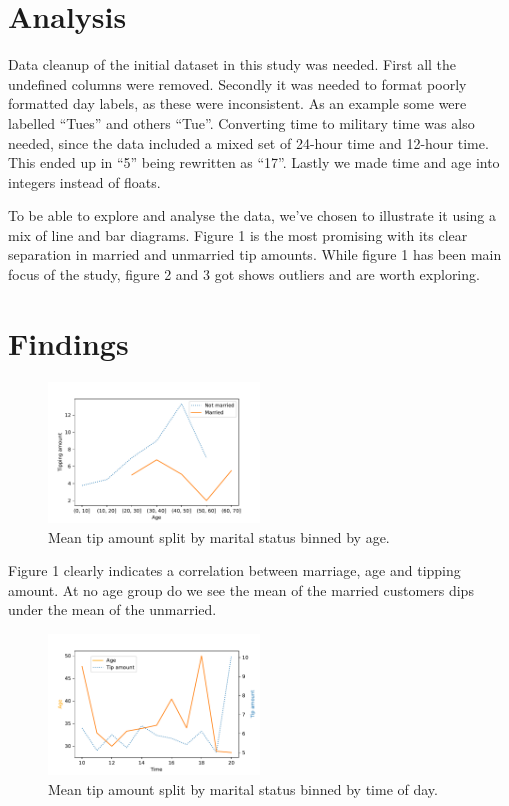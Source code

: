 \documentclass[twoside,twocolumn]{article}
\begin{document}
\section{Analysis}Data cleanup of the initial dataset in this study was needed. First all the undefined columns were removed. Secondly it was needed to format poorly formatted day labels, as these were inconsistent. As an example some were labelled “Tues” and others “Tue”. Converting time to military time was also needed, since the data included a mixed set of 24-hour time and 12-hour time. This ended up in “5” being rewritten as “17”. Lastly we made time and age into integers instead of floats.

To be able to explore and analyse the data, we've chosen to illustrate it using a mix of line and bar diagrams. Figure 1 is the most promising with its clear separation in married and unmarried tip amounts. While figure 1 has been main focus of the study, figure 2 and 3 got shows outliers and are worth exploring.



\section{Findings}

\begin{figure}[h]
  \centering
  \includegraphics[width=0.5\textwidth]{figures/tip_amount_by_age.pdf}
  \caption{Mean tip amount split by marital status binned by age.}
  \label{fig:tip-amount-by-age}
\end{figure}

Figure 1 clearly indicates a correlation between marriage, age and tipping amount. At no age group do we see the mean of the married customers dips under the mean of the unmarried.

\begin{figure}[h]
  \centering
  \includegraphics[width=0.5\textwidth]{figures/time_of_day_and_age.pdf}
  \caption{Mean tip amount split by marital status binned by time of day.}
  \label{fig:time-of-day-and-age}
\end{figure}
\end{document}
